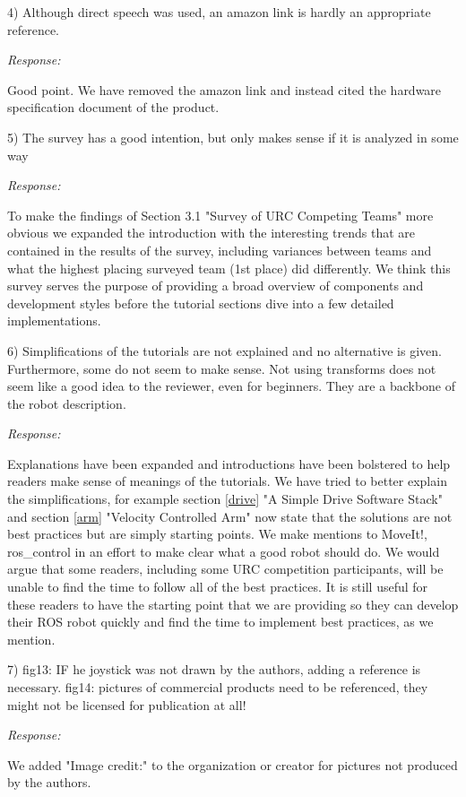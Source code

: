 \documentclass[runningheads,a4paper]{llncs}
\newcommand{\rsp}{\noindent \textit{Response:}}
\begin{document}
4)  Although direct speech was used, an amazon link is hardly an appropriate reference.

\rsp

Good point. We have removed the amazon link and instead cited the hardware specification document of the product.

5)  The survey has a good intention, but only makes sense if it is analyzed in some way

\rsp

To make the findings of Section 3.1 "Survey of URC Competing Teams" more obvious we expanded the introduction with the interesting trends that are contained in the results of the survey, including variances between teams and what the highest placing surveyed team (1st place) did differently. We think this survey serves the purpose of providing a broad overview of components and development styles before the tutorial sections dive into a few detailed implementations.

6)  Simplifications of the tutorials are not explained and no alternative is given. Furthermore, some do not seem to make sense. Not using transforms does not seem like a good idea to the reviewer, even for beginners. They are a backbone of the robot description.

\rsp

Explanations have been expanded and introductions have been bolstered to help readers make sense of meanings of the tutorials. We have tried to better explain the simplifications, for example section \ref{drive} "A Simple Drive Software Stack" and section \ref{arm} "Velocity Controlled Arm" now state that the solutions are not best practices but are simply starting points. We make mentions to MoveIt!, ros\_control in an effort to make clear what a good robot should do. We would argue that some readers, including some URC competition participants, will be unable to find the time to follow all of the best practices. It is still useful for these readers to have the starting point that we are providing so they can develop their ROS robot quickly and find the time to implement best practices, as we mention.

7)  fig13: IF he joystick was not drawn by the authors, adding a reference is necessary. fig14: pictures of commercial products need to be referenced, they might not be licensed for publication at all!

\rsp

We added "Image credit:" to the organization or creator for pictures not produced by the authors.
\end{document}
